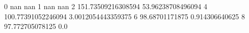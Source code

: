 0 nan nan
1 nan nan
2 151.73509216308594 53.96238708496094
4 100.77391052246094 3.0012054443359375
6 98.68701171875 0.914306640625
8 97.772705078125 0.0
